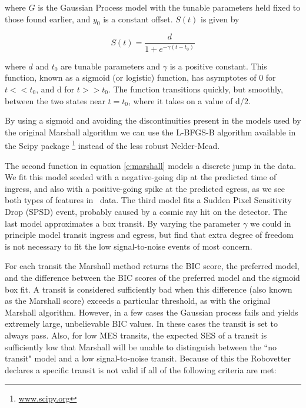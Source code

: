 \noindent
where $G$ is the Gaussian Process model with the tunable parameters held fixed to those found earlier, and $y_0$ is a constant offset. $S(t)$ is given by

\begin{equation}
S(t) = \frac{d}{1 + e^{-\gamma (t-t_0)} }
\end{equation}

\noindent
where $d$ and $t_0$ are tunable parameters and $\gamma$ is a positive constant. This function, known as a sigmoid (or logistic) function, has asymptotes of 0 for $t<<t_0$, and d for $t>>t_0$. The function transitions quickly, but smoothly, between the two states near $t=t_0$, where it takes on a value of d/2. 

By using a sigmoid and avoiding the discontinuities present in the models used by the original Marshall algorithm \citep{Mullally2016} we can use the L-BFGS-B algorithm \citep{Byrd95} available in the Scipy package \footnote{\url{www.scipy.org}} instead of the less robust Nelder-Mead.

The second function in equation \ref{e:marshall} models a discrete jump in the data. We fit this model seeded with a negative-going dip at the predicted time of ingress, and also with a positive-going spike at the predicted egress, as we see both types of features in \Kepler\ data. The third model fits a Sudden Pixel Sensitivity Drop (SPSD) event, probably caused by a cosmic ray hit on the detector. The last model approximates a box transit. By varying the parameter $\gamma$ we could in principle model transit ingress and egress, but find that extra degree of freedom is not necessary to fit the low signal-to-noise events of most concern.

For each transit the Marshall method returns the BIC score, the preferred model, and the difference between the BIC scores of the preferred model and the sigmoid box fit.  A transit is considered sufficiently bad when this difference (also known as the Marshall score) exceeds a particular threshold, as with the original Marshall algorithm.  However, in a few cases the Gaussian process fails and yields extremely large, unbelievable BIC values. In these cases the transit is set to always pass.  Also, for low MES transits, the expected SES of a transit is sufficiently low that Marshall will be unable to distinguish between the ``no transit" model and a low signal-to-noise transit.  Because of this the Robovetter declares a specific transit is not valid if all of the following criteria are met:

